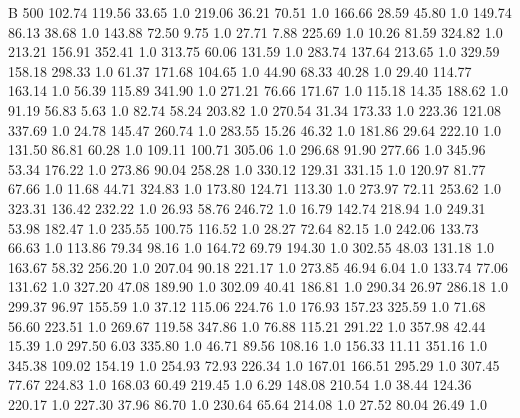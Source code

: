 


B    500
    102.74    119.56     33.65  1.0
    219.06     36.21     70.51  1.0
    166.66     28.59     45.80  1.0
    149.74     86.13     38.68  1.0
    143.88     72.50      9.75  1.0
     27.71      7.88    225.69  1.0
     10.26     81.59    324.82  1.0
    213.21    156.91    352.41  1.0
    313.75     60.06    131.59  1.0
    283.74    137.64    213.65  1.0
    329.59    158.18    298.33  1.0
     61.37    171.68    104.65  1.0
     44.90     68.33     40.28  1.0
     29.40    114.77    163.14  1.0
     56.39    115.89    341.90  1.0
    271.21     76.66    171.67  1.0
    115.18     14.35    188.62  1.0
     91.19     56.83      5.63  1.0
     82.74     58.24    203.82  1.0
    270.54     31.34    173.33  1.0
    223.36    121.08    337.69  1.0
     24.78    145.47    260.74  1.0
    283.55     15.26     46.32  1.0
    181.86     29.64    222.10  1.0
    131.50     86.81     60.28  1.0
    109.11    100.71    305.06  1.0
    296.68     91.90    277.66  1.0
    345.96     53.34    176.22  1.0
    273.86     90.04    258.28  1.0
    330.12    129.31    331.15  1.0
    120.97     81.77     67.66  1.0
     11.68     44.71    324.83  1.0
    173.80    124.71    113.30  1.0
    273.97     72.11    253.62  1.0
    323.31    136.42    232.22  1.0
     26.93     58.76    246.72  1.0
     16.79    142.74    218.94  1.0
    249.31     53.98    182.47  1.0
    235.55    100.75    116.52  1.0
     28.27     72.64     82.15  1.0
    242.06    133.73     66.63  1.0
    113.86     79.34     98.16  1.0
    164.72     69.79    194.30  1.0
    302.55     48.03    131.18  1.0
    163.67     58.32    256.20  1.0
    207.04     90.18    221.17  1.0
    273.85     46.94      6.04  1.0
    133.74     77.06    131.62  1.0
    327.20     47.08    189.90  1.0
    302.09     40.41    186.81  1.0
    290.34     26.97    286.18  1.0
    299.37     96.97    155.59  1.0
     37.12    115.06    224.76  1.0
    176.93    157.23    325.59  1.0
     71.68     56.60    223.51  1.0
    269.67    119.58    347.86  1.0
     76.88    115.21    291.22  1.0
    357.98     42.44     15.39  1.0
    297.50      6.03    335.80  1.0
     46.71     89.56    108.16  1.0
    156.33     11.11    351.16  1.0
    345.38    109.02    154.19  1.0
    254.93     72.93    226.34  1.0
    167.01    166.51    295.29  1.0
    307.45     77.67    224.83  1.0
    168.03     60.49    219.45  1.0
      6.29    148.08    210.54  1.0
     38.44    124.36    220.17  1.0
    227.30     37.96     86.70  1.0
    230.64     65.64    214.08  1.0
     27.52     80.04     26.49  1.0
